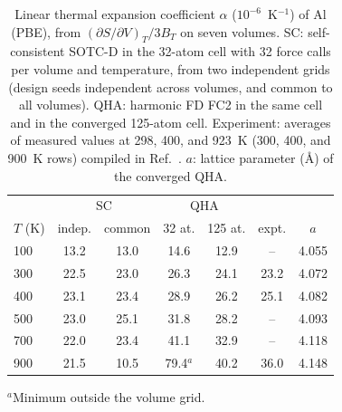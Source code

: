\begin{table}[t]
\caption{Linear thermal expansion coefficient $\alpha$ ($10^{-6}$~K$^{-1}$) of Al (PBE), from $(\partial S/\partial V)_T/3B_T$ on seven volumes. SC: self-consistent SOTC-D in the 32-atom cell with 32 force calls per volume and temperature, from two independent grids (design seeds independent across volumes, and common to all volumes). QHA: harmonic FD FC2 in the same cell and in the converged 125-atom cell. Experiment: averages of measured values at 298, 400, and 923~K (300, 400, and 900~K rows) compiled in Ref.~. $a$: lattice parameter (\AA) of the converged QHA.}
\label{tab:qha}
\footnotesize
\begin{ruledtabular}
\begin{tabular}{lcccccc}
 & \multicolumn{2}{c}{SC} & \multicolumn{2}{c}{QHA} & & \\
$T$ (K) & indep. & common & 32 at. & 125 at. & expt. & $a$\\
\hline
100 & 13.2 & 13.0 & 14.6 & 12.9 & -- & 4.055\\
300 & 22.5 & 23.0 & 26.3 & 24.1 & 23.2 & 4.072\\
400 & 23.1 & 23.4 & 28.9 & 26.2 & 25.1 & 4.082\\
500 & 23.0 & 25.1 & 31.8 & 28.2 & -- & 4.093\\
700 & 22.0 & 23.4 & 41.1 & 32.9 & -- & 4.118\\
900 & 21.5 & 10.5 & 79.4$^a$ & 40.2 & 36.0 & 4.148\\
\end{tabular}
\end{ruledtabular}
$^a$Minimum outside the volume grid.
\end{table}
